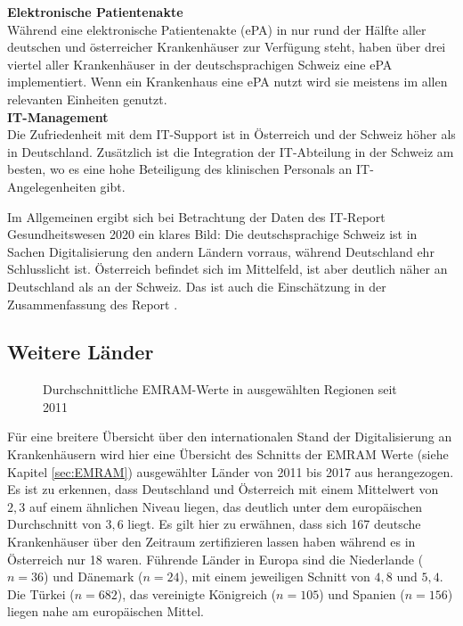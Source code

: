 \textbf{Elektronische Patientenakte}\\
Während eine elektronische Patientenakte (ePA) in nur rund der Hälfte aller deutschen und österreicher Krankenhäuser zur Verfügung steht, haben über drei viertel aller Krankenhäuser in der deutschsprachigen Schweiz eine ePA implementiert. Wenn ein Krankenhaus eine ePA nutzt wird sie meistens im allen relevanten Einheiten genutzt.
\vspace{\parheadvspace}\\
\textbf{IT-Management}\\
Die Zufriedenheit mit dem IT-Support ist in Österreich und der Schweiz höher als in Deutschland. Zusätzlich ist die Integration der IT-Abteilung in der Schweiz am besten, wo es eine hohe Beteiligung des klinischen Personals an IT-Angelegenheiten gibt.

Im Allgemeinen ergibt sich bei Betrachtung der Daten des IT-Report Gesundheitswesen 2020 ein klares Bild: Die deutschsprachige Schweiz ist in Sachen Digitalisierung den andern Ländern vorraus, während Deutschland ehr Schlusslicht ist. Österreich befindet sich im Mittelfeld, ist aber deutlich näher an Deutschland als an der Schweiz. Das ist auch die Einschätzung in der Zusammenfassung des Report \parencite[29]{huebner2020}.

\subsection{Weitere Länder}
\begin{figure}[h]
	\caption{Durchschnittliche EMRAM-Werte in ausgewählten Regionen seit 2011 \parencite{Stephani2019}}
	\label{fig:andere_laender}
\end{figure}
Für eine breitere Übersicht über den internationalen Stand der Digitalisierung an Krankenhäusern wird hier eine Übersicht des Schnitts der EMRAM Werte (siehe Kapitel \ref{sec:EMRAM}) ausgewählter Länder von 2011 bis 2017 aus \cite{Stephani2019} herangezogen. Es ist zu erkennen, dass Deutschland und Österreich mit einem Mittelwert von $2,3$ auf einem ähnlichen Niveau liegen, das deutlich unter dem europäischen Durchschnitt von $3,6$ liegt. Es gilt hier zu erwähnen, dass sich 167 deutsche Krankenhäuser über den Zeitraum zertifizieren lassen haben während es in Österreich nur 18 waren. Führende Länder in Europa sind die Niederlande ($n=36$) und Dänemark ($n=24$), mit einem jeweiligen Schnitt von $4,8$ und $5,4$. Die Türkei ($n=682$), das vereinigte Königreich ($n=105$) und Spanien ($n=156$) liegen nahe am europäischen Mittel.

